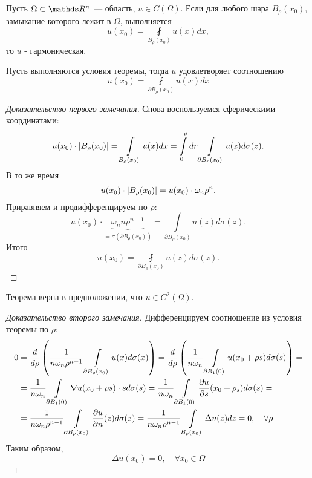 \begin{theorem}
Пусть $\Omega \subset \real^n$ --- область, $u \in C(\Omega)$. Если для любого шара $B_\rho (x_0)$, замыкание которого лежит в $\Omega$, выполняется
$$ u(x_0) = \fint \limits_{B_\rho(x_0)} u(x) dx,$$
то $u$ - гармоническая. 
\end{theorem}
\begin{note}
Пусть выполняются условия теоремы, тогда $u$ удовлетворяет соотношению
$$ u(x_0) = \fint \limits_{\partial B_\rho(x_0)} u(x) dx$$
\end{note}
\begin{proof}[Доказательство первого замечания]
Снова воспользуемся сферическими координатами:
$$u(x_0) \cdot \abs{B_\rho (x_0)} = \int \limits_{B_\rho (x_0)} u(x) dx = \int \limits_0^\rho dr \int \limits_{\partial B_r (x_0)} u(z) d \sigma(z).$$
В то же время
$$ u(x_0) \cdot \abs{B_\rho (x_0)} = u(x_0) \cdot \omega_n \rho^n.$$
Приравняем и продифференцируем по $\rho$:
$$ u(x_0) \cdot \underbrace {\omega_n n \rho^{n-1}}_{= \sigma(\partial B_\rho (x_0))} = \int \limits_{\partial B_\rho (x_0)} u(z) d\sigma(z).$$
Итого
$$ u(x_0) = \fint \limits_{\partial B_\rho (x_0)} u(z) d\sigma(z).$$

\end{proof}

\begin{note}
Теорема верна в предположении, что $u \in C^2 (\Omega)$.
\end{note}
\begin{proof}[Доказательство второго замечания]
Дифференцируем соотношение из условия теоремы по $\rho$:
\begin{align*}
0 &= \frac {d} {d\rho} \left( \frac {1} {n \omega_n \rho^{n-1}} \int \limits_{\partial B_\rho (x_0)} u(x) d\sigma(x) \right) = 
 \frac {d} {d\rho} \left( \frac {1} {n \omega_n} \int \limits_{\partial B_1(0)} u(x_0 + \rho s) d\sigma(s) \right) = \\
&= \frac {1} {n \omega_n} \int \limits_{\partial B_1 (0)} \nabla u(x_0 + \rho s) \cdot s d\sigma(s) = 
 \frac {1} {n \omega_n} \int \limits_{\partial B_1 (0)} \pder[u]{s}(x_0 +\rho_s) d\sigma(s) = \\
&= \frac {1} {n \omega_n \rho^{n-1}} \int \limits_{\partial B_\rho (x_0)} \pder[u]{n}(z) d\sigma(z) = 
 \frac {1} {n \omega_n \rho^{n-1}} \int \limits_{B_\rho (x_0)} \Delta u (z) dz = 0, \quad \forall \rho
\end{align*}
Таким образом,
$$\Delta u(x_0) = 0, \quad \forall x_0 \in \Omega$$

\end{proof}

